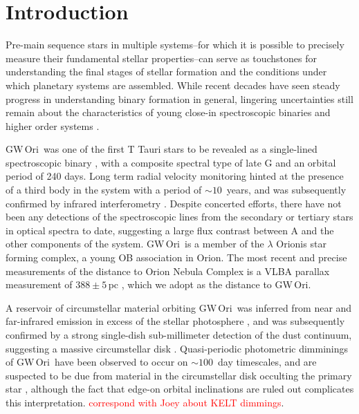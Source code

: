 \documentclass[twocolumn]{aastex61}
\newcommand{\todo}[1]{ \textcolor{red}{#1}}
\newcommand{\gw}{GW\,Ori}
\begin{document}
\section{Introduction} \label{sec:intro}

Pre-main sequence stars in multiple systems--for which it is possible to precisely measure their fundamental stellar properties--can serve as touchstones for understanding the final stages of stellar formation and the conditions under which planetary systems are assembled. While recent decades have seen steady progress in understanding binary formation in general, lingering uncertainties still remain about the characteristics of young close-in spectroscopic binaries and higher order systems \citep{duchene13}.

\gw\ was one of the first T Tauri stars to be revealed as a single-lined spectroscopic binary \citep{mathieu91}, with a composite spectral type of late G and an orbital period of 240 days. Long term radial velocity monitoring hinted at the presence of a third body in the system with a period of $\sim$$10\,$ years, and was subsequently confirmed by infrared interferometry \citep{berger11}. Despite concerted efforts, there have not been any detections of the spectroscopic lines from the secondary or tertiary stars in optical spectra to date, suggesting a large flux contrast between A and the other components of the system. \gw\ is a member of the $\lambda$ Orionis star forming complex, a young OB association \citep{dolan00,dolan01,dolan02} in Orion. The most recent and precise measurements of the distance to Orion Nebula Complex is a VLBA parallax measurement of $388\pm5\,$pc \citep{kounkel16}, which we adopt as the distance to \gw.

A reservoir of circumstellar material orbiting \gw\ was inferred from near and far-infrared emission in excess of the stellar photosphere \citep{mathieu91}, and was subsequently confirmed by a strong single-dish sub-millimeter detection of the dust continuum, suggesting a massive circumstellar disk \citep[$M_\mathrm{disk} \gtrsim 0.1\,M_\odot$;][]{mathieu95}. Quasi-periodic photometric dimminings of \gw\ have been observed to occur on $\sim100\,$ day timescales, and are suspected to be due from material in the circumstellar disk occulting the primary star \citep{shevchenko92,shevchenko98}, although the fact that edge-on orbital inclinations are ruled out complicates this interpretation. \todo{correspond with Joey about KELT dimmings}.
\end{document}
